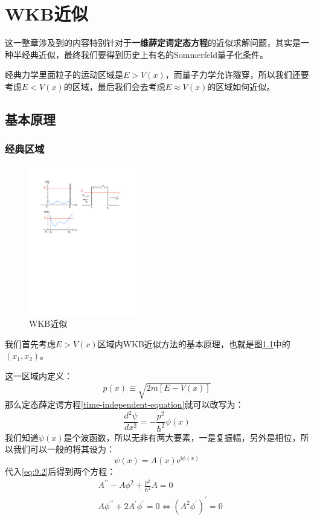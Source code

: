 \documentclass[a4paper,zihao=-4,linespread=1]{ctexrep}
\begin{document}
    




    \chapter{WKB近似}
    这一整章涉及到的内容特别针对于\textbf{一维薛定谔定态方程}的近似求解问题，其实是一种半经典近似，最终我们要得到历史上有名的Sommerfeld量子化条件。
    
    经典力学里面粒子的运动区域是$E>V(x)$，而量子力学允许隧穿，所以我们还要考虑$E<V(x)$的区域，最后我们会去考虑$E\approx V(x)$的区域如何近似。
    
    \section{基本原理}
    \subsection*{经典区域}
    \begin{figure}
        \centering
        \includegraphics[width=5cm]{fig/9-1.pdf}
        \caption{WKB近似}
        \label{fig:9.1}
    \end{figure}
    我们首先考虑$E>V(x)$区域内WKB近似方法的基本原理，也就是图\ref{fig:9.1}中的$(x_1,x_2)$。

    这一区域内定义：
    \begin{equation}
        p(x)\equiv\sqrt{2m\left[E-V(x)\right]}
    \end{equation}
    那么定态薛定谔方程\ref{time-independent-equation}就可以改写为：
    \begin{equation}
        \label{eq:9.2}
        \frac{d^2\psi}{dx^2}=-\frac{p^2}{\hbar^2}\psi(x)
    \end{equation}
    我们知道$\psi(x)$是个波函数，所以无非有两大要素，一是复振幅，另外是相位，所以我们可以一般的将其设为：
    \[\psi(x)=A(x)\mathrm{e}^{\mathrm{i}\phi(x)}\]
    代入\ref{eq:9.2}后得到两个方程：
    \begin{equation}
        \label{eq:9.3}
        \begin{aligned}
            & A^{\prime\prime}-A\phi^2+\frac{p^2}{\hbar^2}A=0\\
            & A\phi^{\prime\prime}+2A^\prime\phi^\prime=0\Leftrightarrow \left(A^2\phi^\prime\right)^\prime=0
        \end{aligned}
    \end{equation}
\end{document}

